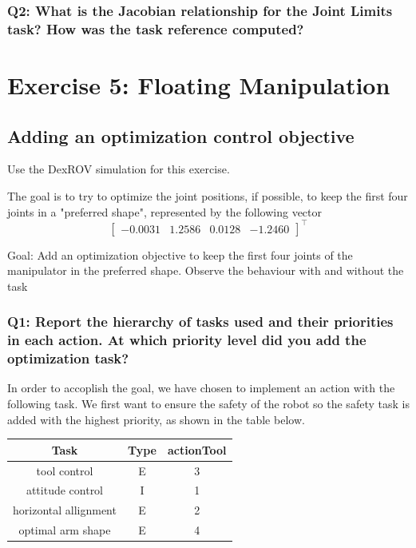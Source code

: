 \documentclass{article}
\begin{document}
\subsubsection{Q2: What is the Jacobian relationship for the Joint Limits task? How was the task reference computed?}

\clearpage
\section{Exercise 5: Floating Manipulation}
\subsection{Adding an optimization control objective}
Use the DexROV simulation for this exercise.

The goal is to try to optimize the joint positions, if possible, to keep the first four joints in a "preferred shape", represented by the following vector
\begin{displaymath}
\begin{bmatrix}-0.0031 & 1.2586 & 0.0128 & -1.2460 \end{bmatrix}^\top
\end{displaymath}

Goal: Add an optimization objective to keep the first four joints of the manipulator in the preferred shape. Observe the behaviour with and without the task

\subsubsection{Q1: Report the hierarchy of tasks used and their priorities in each action. At which priority level did you add the optimization task?}

In order to accoplish the goal, we have chosen to implement an action with the following task. We first want to ensure the safety of the robot so the safety task is added with the highest priority, as shown in the table below. 

\begin{tabular}{ccc}
	\toprule
	Task & Type & actionTool	\\
	\midrule
	tool control                    & E & 3  \\
	\hdashline
	attitude control                & I & 1  \\
	\hdashline
	horizontal allignment           & E & 2  \\
	\hdashline
	optimal arm shape				& E & 4  \\
	\bottomrule
\end{tabular}
\end{document}
